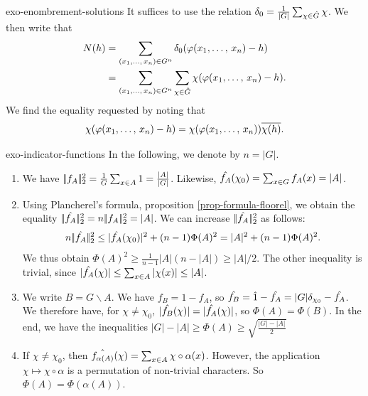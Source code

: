  
\begin{correction}{exo-enombrement-solutions}
It suffices to use the relation $ \delta_0 = \frac{1}{|G|} \sum_{\chi \in \hat{G}}{\chi} $. We then write that
\begin{align*}
N (h) & = \sum_{(x_1, \ldots, \, x_n) \in G^n}{\delta_0 (\varphi (x_1, \ldots, \, x_n) - h)} \\
& = \sum_{(x_1, \ldots, \, x_n) \in G^n}{\sum_{\chi \in \hat{G}}{\chi (\varphi (x_1, \ldots, \, x_n ) - h)}}.
\end{align*}
We find the equality requested by noting that
\begin{equation*}
\chi (\varphi (x_1, \ldots, \, x_n) - h) = \chi (\varphi (x_1, \ldots, \, x_n)) \overline{\chi (h)}.
\end{equation*}
\end{correction}
 
 
\begin{correction}{exo-indicator-functions}
In the following, we denote by $ n = |G| $. \begin{enumerate}
\item We have $ |\!| f_A |\!|_2^2 = \frac{1}{G} \sum_{x \in A}{1} = \frac{| A |}{|G|} $. Likewise, $ \hat{f_A} (\chi_0) = \sum_{x \in G}{f_A(x)} = | A | $.
\item Using Plancherel's formula, proposition \ref{prop-formula-floorel}, we obtain the equality $ |\!| \hat{f_A} |\!|_2^2 = n |\!| f_A |\!|_2^2 = | A | $. We can increase $ |\!| \hat{f_A} |\!|_2^2 $ as follows:
\begin{equation*}
n |\!| \hat{f_A} |\!|_2^2 \leq | \hat{f_A} (\chi_0) |^2 + (n-1) \Phi (A)^2 = | A |^2 + (n -1) \Phi (A)^2.
\end{equation*}
We thus obtain $ \Phi (A)^2 \geq \tfrac{1}{n-1} | A | (n- | A |) \geq | A |/2 $. The other inequality is trivial, since $ | \hat{f_A} (\chi) | \leq \sum_{x \in A}{| \chi (x) |} \leq | A | $.
\item We write $ B = G \backslash A $. We have $ f_B = 1-f_A $, so $ \hat{f_B} = \hat{1} - \hat{f_A} = |G| \delta_{\chi_0} - \hat{f_A} $. We therefore have, for $ \chi \neq \chi_0 $, $ | \hat{f_B} (\chi) | = | \hat{f_A} (\chi) | $, so $ \Phi (A) = \Phi (B) $. In the end, we have the inequalities $ |G| - | A | \geq \Phi (A) \geq \sqrt{\frac{|G| - | A |}{2}} $
\item If $ \chi \neq \chi_0 $, then $ \hat{f_{\alpha (A)}} (\chi) = \sum_{x \in A}{\chi \circ \alpha (x)} $. However, the application $ \chi \mapsto \chi \circ \alpha $ is a permutation of non-trivial characters. So $ \Phi (A) = \Phi (\alpha (A)) $.
\end{enumerate}
\end{correction}
 
